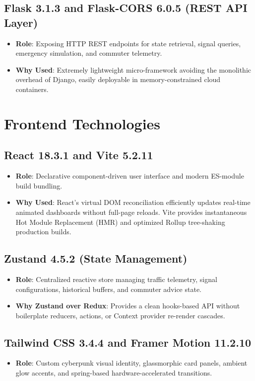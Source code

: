 \documentclass[11pt,a4paper,oneside]{report}
\begin{document}
\subsection{Flask 3.1.3 and Flask-CORS 6.0.5 (REST API Layer)}
\begin{itemize}[leftmargin=*]
    \item \textbf{Role}: Exposing HTTP REST endpoints for state retrieval, signal queries, emergency simulation, and commuter telemetry.
    \item \textbf{Why Used}: Extremely lightweight micro-framework avoiding the monolithic overhead of Django, easily deployable in memory-constrained cloud containers.
\end{itemize}

\section{Frontend Technologies}

\subsection{React 18.3.1 and Vite 5.2.11}
\begin{itemize}[leftmargin=*]
    \item \textbf{Role}: Declarative component-driven user interface and modern ES-module build bundling.
    \item \textbf{Why Used}: React's virtual DOM reconciliation efficiently updates real-time animated dashboards without full-page reloads. Vite provides instantaneous Hot Module Replacement (HMR) and optimized Rollup tree-shaking production builds.
\end{itemize}

\subsection{Zustand 4.5.2 (State Management)}
\begin{itemize}[leftmargin=*]
    \item \textbf{Role}: Centralized reactive store managing traffic telemetry, signal configurations, historical buffers, and commuter advice state.
    \item \textbf{Why Zustand over Redux}: Provides a clean hooks-based API without boilerplate reducers, actions, or Context provider re-render cascades.
\end{itemize}

\subsection{Tailwind CSS 3.4.4 and Framer Motion 11.2.10}
\begin{itemize}[leftmargin=*]
    \item \textbf{Role}: Custom cyberpunk visual identity, glassmorphic card panels, ambient glow accents, and spring-based hardware-accelerated transitions.
\end{itemize}
\end{document}
